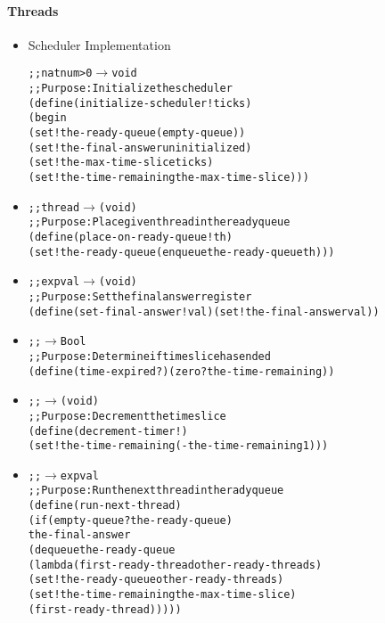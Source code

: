 \documentclass{beamer}
\newcommand{\arrow}{\(\rightarrow\)}
\newcommand{\quot}{\texttt{\textquotesingle{}}}
\begin{document}
\begin{frame}[fragile]
\framesubtitle{Threads}
\begin{tiny}
\begin{itemize}
\item<1-> Scheduler Implementation
\begin{alltt}
;; natnum>0 \arrow{} void
;; Purpose: Initialize the scheduler
(define (initialize-scheduler! ticks)
  (begin
    (set! the-ready-queue (empty-queue))
    (set! the-final-answer \quot{}uninitialized)
    (set! the-max-time-slice ticks)
    (set! the-time-remaining the-max-time-slice)))
\end{alltt}

\item<2->
\begin{alltt}    
;; thread \arrow{} (void)
;; Purpose: Place given thread in the ready queue
(define (place-on-ready-queue! th)
  (set! the-ready-queue (enqueue the-ready-queue th)))
\end{alltt}

\item<3->
\begin{alltt}
;; expval \arrow{} (void)
;; Purpose: Set the final answer register
(define (set-final-answer! val) (set! the-final-answer val))
\end{alltt}

\item<4->
\begin{alltt}
;;  \arrow{} Bool
;; Purpose: Determine if time slice has ended
(define (time-expired?) (zero? the-time-remaining))
\end{alltt}

\item<5->
\begin{alltt}
;;  \arrow{} (void)
;; Purpose: Decrement the time slice
(define (decrement-timer!)
  (set! the-time-remaining (- the-time-remaining 1)))
\end{alltt}

\item<6->
\begin{alltt}
;;  \arrow{} expval
;; Purpose: Run the next thread in the rady queue
(define (run-next-thread)
  (if (empty-queue? the-ready-queue)
      the-final-answer
      (dequeue the-ready-queue
               (lambda (first-ready-thread other-ready-threads)
                 (set! the-ready-queue other-ready-threads)
                 (set! the-time-remaining the-max-time-slice)
                 (first-ready-thread)))))
\end{alltt}

\end{itemize}
\end{tiny}
\end{frame}
\end{document}
